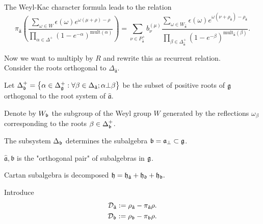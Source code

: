 \documentclass[pdftex]{beamer}
\newcommand{\afh}{\hat{\mathfrak{a}}}
\theoremstyle{definition} \newtheorem{Def}{Definition}
\begin{document}
\begin{frame}
The Weyl-Kac character formula leads to the relation 
\begin{equation*}
\pi _{\afh}\left( \frac{\sum_{\omega \in W}\epsilon (\omega )e^{\omega (\mu +\rho )-\rho }}
  {\prod_{\alpha \in \Delta ^{+}}(1-e^{-\alpha })^{\mathrm{mult}(\alpha )}}\right) =
\sum_{\nu \in P_{\afh}^{+}}b_{\nu }^{(\mu )}
\frac{\sum_{\omega \in W_{\afh}}\epsilon (\omega )e^{\omega (\nu +\rho _{\afh})-\rho _{\afh}}}
{\prod_{\beta \in \Delta _{\afh}^{+}}(1-e^{-\beta })^{\mathrm{mult}_{\afh}(\beta )}}.  
\end{equation*}

Now we want to multiply by $R$ and rewrite this as recurrent relation. \\

Consider the roots orthogonal to $\Delta_{\afh}$.

Let $\Delta^{+}_{\frak{b}}=\left\{\alpha\in \Delta^{+}_{\frak{g}}:\forall
\beta\in\Delta_{\afh} ; \alpha\bot \beta\right\}$ be the subset of
positive roots of $\frak{g}$ orthogonal to the root system of $\afh$.

Denote by $W_{\frak{b}}$ the subgroup of the Weyl group $W$ generated by the
reflections $\omega _{\beta }$ corresponding to the roots $\beta \in \Delta
_{\frak{b}}^{+}$.

The subsystem $\Delta _{\frak{b}}$ determines the subalgebra $\frak{b}=\frak{%
a}_{\bot }\subset \frak{g}$.

$\afh, \mathfrak{b}$ is the "orthogonal pair" of subalgebras in $\frak{g}$.

 Cartan subalgebra is decomposed
$\frak{{h}=\frak{h}_{\afh}+\frak{h}_{d}+\frak{h}_{\frak{b}}.}$

Introduce
\begin{eqnarray*}
\mathcal{D}_{\afh} :=\rho_{\afh}-\pi_{\afh}\rho.\\
\mathcal{D}_{\frak{b}} :=\rho_{\frak{b}}-\pi_{\frak{b}}\rho.
\end{eqnarray*}

\end{frame}
\end{document}
